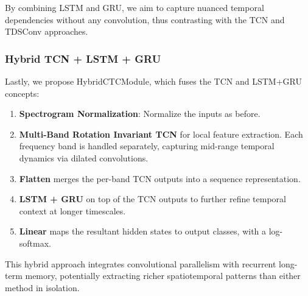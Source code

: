 By combining LSTM and GRU, we aim to capture nuanced temporal dependencies without any convolution, thus contrasting with the TCN and TDSConv approaches.

\subsubsection{Hybrid TCN + LSTM + GRU}

Lastly, we propose HybridCTCModule, which fuses the TCN and LSTM+GRU concepts:

\begin{enumerate}
    \item\textbf{Spectrogram Normalization}: Normalize the inputs as before.

    \item\textbf{Multi-Band Rotation Invariant TCN} for local feature extraction. Each frequency band is handled separately, capturing mid-range temporal dynamics via dilated convolutions.

    \item\textbf{Flatten} merges the per-band TCN outputs into a sequence representation.

    \item\textbf{LSTM + GRU} on top of the TCN outputs to further refine temporal context at longer timescales.

    \item\textbf{Linear} maps the resultant hidden states to output classes, with a log-softmax.
\end{enumerate}

This hybrid approach integrates convolutional parallelism with recurrent long-term memory, potentially extracting richer spatiotemporal patterns than either method in isolation.
